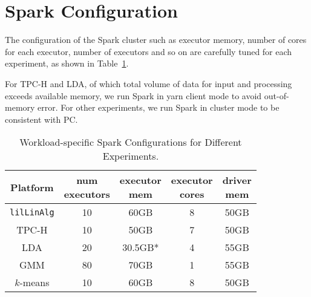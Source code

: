 \section{Spark Configuration}
\label{sec:spark}

The configuration of the Spark cluster such as
executor memory, number of cores for each executor, number of
executors and so on are carefully tuned for each
experiment, as shown in Table~\ref{fig:sparkConf}.

For TPC-H and LDA, of which total volume of data for input and
processing exceeds available memory, we run Spark in yarn client
mode to avoid out-of-memory error. For other experiments, we run Spark
in cluster mode to be consistent with PC.

\begin{table}[H]
\begin{center}
\begin{tabular}{|c||c|c|c|c|}
\hline
Platform & \makecell{num\\executors} & \makecell{executor \\mem} & \makecell{executor \\cores}& \makecell{driver \\mem}\\
\hline
\texttt{lilLinAlg} &10 & 60GB & 8 & 50GB \\
TPC-H &10 & 50GB & 7 & 50GB \\
LDA &20 & 30.5GB* &4 & 55GB\\
GMM&80 & 70GB & 1 & 55GB\\
$k$-means &10 &60GB & 8 & 50GB\\
\hline
\end{tabular}
\caption{Workload-specific Spark Configurations for Different Experiments.}
\label{fig:sparkConf}
\end{center}
\end{table}

